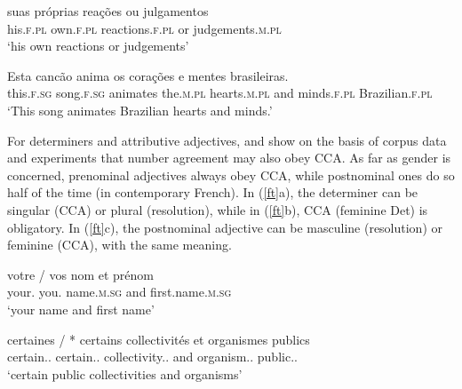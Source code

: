 {\begin{exe}
 \ex
\begin{xlista}
\ex \gll suas pr\'{o}prias rea\c{c}\~{o}es ou julgamentos \\
his.\textsc{f.pl} own.\textsc{f.pl} reactions.\textsc{f.pl} or judgements.\textsc{m.pl} \\
\glt `his own reactions or judgements' \citep[435]{Villavicencio:Sadler:ea:05}  


\ex \gll Esta canc\~{a}o anima os cora\c{c}\~{o}es e mentes brasileiras. \\
 this.\textsc{f.sg}  song.\textsc{f.sg} animates the.\textsc{m.pl} hearts.\textsc{m.pl} and minds.\textsc{f.pl} Brazilian.\textsc{f.pl} \\
\glt `This song animates Brazilian hearts and minds.' \citep[437]{Villavicencio:Sadler:ea:05} 
\end{xlista} \label{fo}
\end{exe}

For  determiners and attributive adjectives, \citet{An:Abeille:17} and \citet{Abeille:An:Shiraishi:18} show on the basis of corpus data and experiments that number agreement may also obey CCA. As far as gender is concerned, prenominal adjectives always obey CCA, while postnominal ones do so half of the time (in contemporary French). In (\ref{ft}a), the determiner can be singular (CCA) or plural (resolution), while in (\ref{ft}b), CCA (feminine Det) is obligatory. In (\ref{ft}c), the postnominal adjective can be masculine (resolution) or feminine (CCA), with the same meaning.

\begin{exe}
 \ex
\begin{xlista}
\ex  
\gll votre / vos nom et pr\'{e}nom \\
     your.\SG{} {} you.\PL{} name.\textsc{m.sg} and first.name.\textsc{m.sg} \\
\glt `your name and first name' \citep[]{An:Abeille:17}

\ex 
\gll certaines          / *   certains collectivités et organismes publics \\
     certain.\F.\PL{} {} {} certain.\MAS.\PL{} collectivity.\F.\PL{} and organism.\MAS.\PL{} public.\MAS.\PL{} \\
\glt `certain public collectivities and organisms' \citep[]{Abeille:An:Shiraishi:18}


\end{xlista}
\end{exe}}
